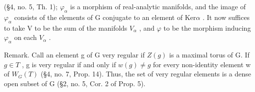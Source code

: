(§4, no. 5, Th. 1); \(\varphi_{\alpha}\) is a morphism of real-analytic manifolds, and the image of \(\varphi_{\alpha}\) consists of the elements of G conjugate to an element of \(\mathrm{Ker} \alpha\) . It now suffices to take V to be the sum of the manifolds \(V_{\alpha}\) , and \(\varphi\) to be the morphism inducing \(\varphi_{\alpha}\) on each \(V_{\alpha}\) .

Remark. Call an element g of G very regular if \(Z(g)\) is a maximal torus of G. If \(g \in T\) , g is very regular if and only if \(w(g) \neq g\) for every non-identity element w of \(W_{G}(T)\) (§4, no. 7, Prop. 14). Thus, the set of very regular elements is a dense open subset of G (§2, no. 5, Cor. 2 of Prop. 5).

